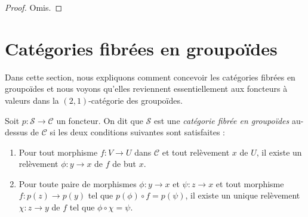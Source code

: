 \begin{proof}
Omis.
\end{proof}





\section{Catégories fibrées en groupoïdes}
\label{section-fibred-groupoids}

\noindent
Dans cette section, nous expliquons comment concevoir les catégories fibrées en groupoïdes
et nous voyons qu'elles reviennent essentiellement aux foncteurs à valeurs dans
la $(2, 1)$-catégorie des groupoïdes.

\begin{definition}
\label{definition-fibred-groupoids}
Soit $p : \mathcal{S} \to \mathcal{C}$ un foncteur.
On dit que $\mathcal{S}$ est une {\it catégorie fibrée en groupoïdes} au-dessus de $\mathcal{C}$ si
les deux conditions suivantes sont satisfaites :
\begin{enumerate}
\item Pour tout morphisme $f : V \to U$ dans $\mathcal{C}$ et tout
relèvement $x$ de $U$, il existe un relèvement $\phi : y \to x$ de $f$
de but $x$.
\item Pour toute paire de morphismes $\phi : y \to x$ et $ \psi : z \to x$
et tout morphisme $f : p(z) \to p(y)$ tel que $p(\phi) \circ f = p(\psi)$,
il existe un unique relèvement $\chi : z \to y$ de $f$ tel que
$\phi \circ \chi = \psi$.
\end{enumerate}
\end{definition}

